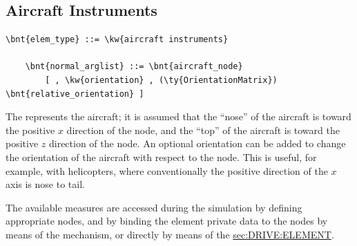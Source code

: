 \subsection{Aircraft Instruments}
\begin{Verbatim}[commandchars=\\\{\}]
    \bnt{elem_type} ::= \kw{aircraft instruments}

    \bnt{normal_arglist} ::= \bnt{aircraft_node}
        [ , \kw{orientation} , (\ty{OrientationMatrix}) \bnt{relative_orientation} ]
\end{Verbatim}
The  represents the aircraft; it is assumed
that the ``nose'' of the aircraft is toward the positive $x$ direction
of the node, and the ``top'' of the aircraft is toward the positive 
$z$ direction of the node.
An optional orientation can be added to change the orientation 
of the aircraft with respect to the node.
This is useful, for example, with helicopters, where conventionally
the positive direction of the $x$ axis is nose to tail.

The available measures are accessed during the simulation 
by defining appropriate  nodes, and by binding
the  element private data to the nodes 
by means of the  mechanism, or directly by means
of the 
\hyperref{\kw{element} drive}{\kw{element} drive (see Section~}{)}{sec:DRIVE:ELEMENT}.

